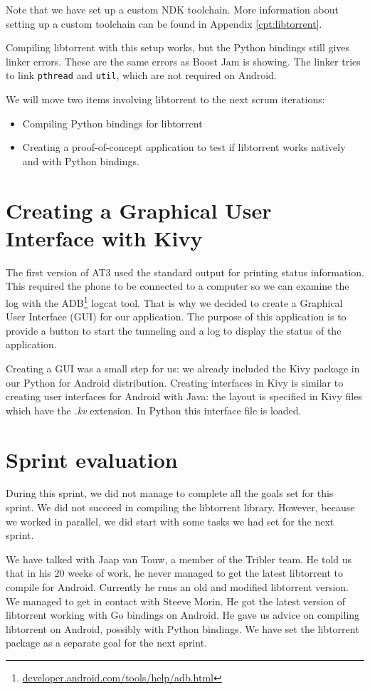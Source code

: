 		Note that we have set up a custom NDK toolchain. More information about setting up a custom toolchain can be found in Appendix \ref{cpt:libtorrent}.
		
		Compiling libtorrent with this setup works, but the Python bindings still gives linker errors. These are the same errors as Boost Jam is showing. The linker tries to link \texttt{pthread} and \texttt{util}, which are not required on Android.
		
		We will move two items involving libtorrent to the next scrum iterations:
		\begin{itemize}
		\item Compiling Python bindings for libtorrent
		\item Creating a proof-of-concept application to test if libtorrent works natively and with Python bindings.
		\end{itemize}
	
	\section{Creating a Graphical User Interface with Kivy}
		The first version of AT3 used the standard output for printing status information. This required the phone to be connected to a computer so we can examine the log with the ADB\footnote{\href{http://developer.android.com/tools/help/adb.html}{developer.android.com/tools/help/adb.html}} logcat tool. That is why we decided to create a Graphical User Interface (GUI) for our application. The purpose of this application is to provide a button to start the tunneling and a log to display the status of the application.
	
		Creating a GUI was a small step for us: we already included the Kivy package in our Python for Android distribution. Creating interfaces in Kivy is similar to creating user interfaces for Android with Java: the layout is specified in Kivy files which have the \emph{.kv} extension. In Python this interface file is loaded.
	
	\section{Sprint evaluation}
		During this sprint, we did not manage to complete all the goals set for this sprint. We did not succeed in compiling the libtorrent library. However, because we worked in parallel, we did start with some tasks we had set for the next sprint.
		
		We have talked with Jaap van Touw, a member of the Tribler team. He told us that in his 20 weeks of work, he never managed to get the latest libtorrent to compile for Android.
		Currently he runs an old and modified libtorrent version. We managed to get in contact with Steeve Morin. He got the latest version of libtorrent working with Go bindings on Android. He gave us advice on compiling libtorrent on Android, possibly with Python bindings. We have set the libtorrent package as a separate goal for the next sprint.
